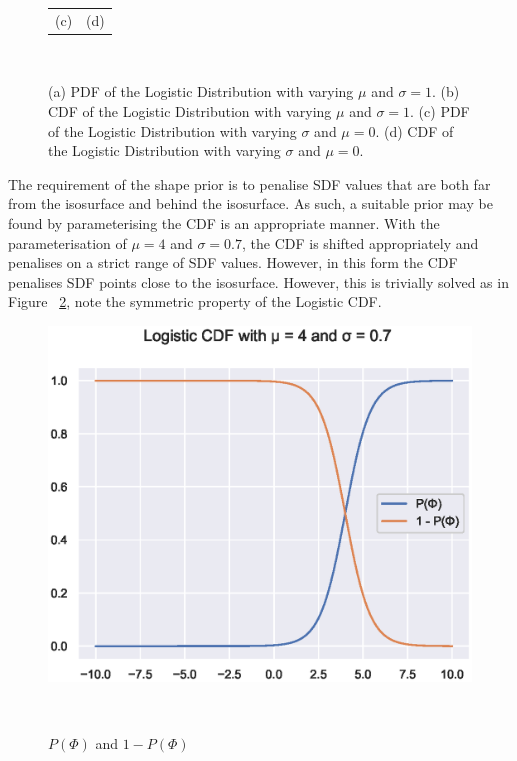 \begin{figure}[!htbp]
\begin{tabular}{cc}
    (c) & (d) \\
	\end{tabular}
  \caption[Shape Prior PDF's and CDF's]
  {
    (a) PDF of the Logistic Distribution with varying \( \mu \) and \( \sigma = 1 \).
    (b) CDF of the Logistic Distribution with varying \( \mu \) and \( \sigma = 1 \).
    (c) PDF of the Logistic Distribution with varying \( \sigma \) and \( \mu = 0 \).
    (d) CDF of the Logistic Distribution with varying \( \sigma \) and \( \mu = 0 \).
  }
~\label{figure:probobj_logistic}
\end{figure}

The requirement of the shape prior is to penalise SDF values that are both far from the isosurface 
and behind the isosurface. As such, a suitable prior may be found by parameterising the CDF is an 
appropriate manner. With the parameterisation of \( \mu = 4 \) and \( \sigma = 0.7 \), the CDF is 
shifted appropriately and penalises on a strict range of SDF values. However, in this form the CDF 
penalises SDF points close to the isosurface. However, this is trivially solved as in Figure
~\ref{figure:probobj_shape_prior}, note the symmetric property of the Logistic CDF\@.
\begin{figure}[!htbp]
  \centering
  \includegraphics[width=.8\linewidth]{figures/object_recon/logistic/prior.eps}
  \caption[Shape Prior PDF's and CDF's]
  {\( P(\Phi) \) and \( 1 - P(\Phi) \)}
~\label{figure:probobj_shape_prior}
\end{figure}

